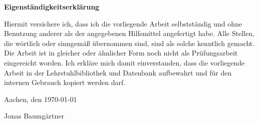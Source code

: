 \Large
\textbf{Eigenständigkeitserklärung}

\normalsize
Hiermit versichere ich, dass ich die vorliegende Arbeit selbstständig und ohne Benutzung anderer als der angegebenen Hilfsmittel angefertigt habe. Alle Stellen, die wörtlich oder sinngemäß übernommen sind, sind als solche kenntlich gemacht. Die Arbeit ist in gleicher oder ähnlicher Form noch nicht als Prüfungsarbeit eingereicht worden. Ich erkläre mich damit einverstanden, dass die vorliegende Arbeit in der Lehrstuhlbibliothek und Datenbank aufbewahrt und für den internen Gebrauch kopiert werden darf. \newline \newline


Aachen, den \today \newline \newline

Jonas Baumgärtner
